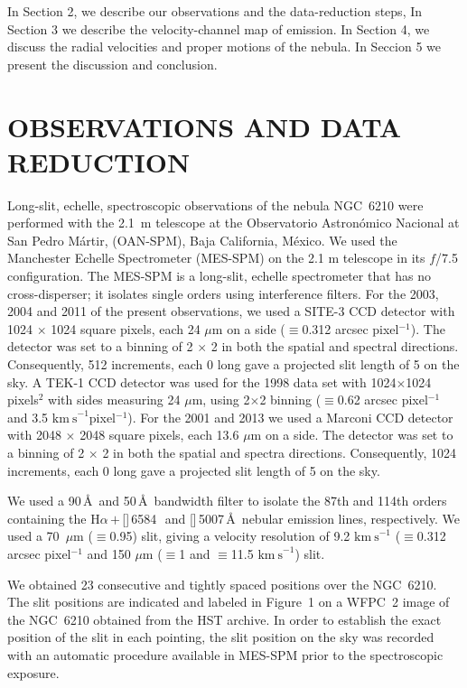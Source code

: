 \documentclass{aa}
\makeatletter
\newcommand{\kms}{\ensuremath{\mathrm{km\ s}^{-1}}}
\newcommand\NIIlam{[\ion{N}{2}]\,6584\,}
\newcommand\OIIIlam{[\ion{O}{3}]\,5007\,\AA\@}
\newcommand\Ha{\ensuremath{\mathrm{H}\alpha}}
\makeatother
\begin{document}
In Section 2, we describe our observations and the data-reduction steps, In Section 3 we describe the velocity-channel map of emission. In Section 4, we discuss the radial velocities and proper motions of the nebula. In Seccion 5 we present the discussion and conclusion.

\section{OBSERVATIONS AND DATA REDUCTION}
\label{sec:observations}

Long-slit, echelle, spectroscopic observations of the nebula NGC~6210
were performed with the 2.1~m telescope at the Observatorio
Astron\'omico Nacional at San Pedro M\'artir, (OAN-SPM), Baja
California, M\'exico. We used the Manchester Echelle Spectrometer
(MES-SPM) \citep{Meaburn03} on the 2.1 m telescope in its $f$/7.5
configuration.  The MES-SPM is a long-slit, echelle spectrometer that
has no cross-disperser; it isolates single orders using interference
filters. For the 2003, 2004 and 2011 of the present observations, we used a
SITE-3 CCD detector with 1024 $\times$ 1024 square pixels, each 24
$\mu$m on a side ($\equiv$0.312 arcsec pixel$^{-1}$). The detector
was set to a binning of 2 $\times$ 2 in both the spatial and spectral
directions. Consequently, 512 increments, each 0 long gave
a projected slit length of 5 on the sky. A TEK-1 CCD detector
was used for the 1998 data set with 1024$\times$1024 pixels$^2$ with
sides measuring 24 $\mu$m, using 2$\times$2 binning ($\equiv$0.62 arcsec
pixel$^{-1}$ and 3.5 \kms pixel$^{-1}$). For the 2001 and 2013 we used
a Marconi CCD detector with 2048 $\times$ 2048 square pixels, each 13.6
$\mu$m on a side. The detector was set to a binning of 2 $\times$ 2 in
both the spatial and spectra directions. Consequently, 1024
increments, each 0 long gave a projected slit length of
5 on the sky.

We used a 90\,\AA\, and 50\,\AA\, bandwidth
filter to isolate the 87th and 114th orders containing the
\Ha\,$+$\,\NIIlam\, and \OIIIlam\, nebular emission lines,
respectively. We used a 70~$\mu$m{} ($\equiv$0.95\arcsec) slit, giving
a velocity resolution of 9.2 \kms{} ($\equiv$0.312 arcsec
pixel$^{-1}$ and 150 $\mu$m{} ($\equiv$1 and $\equiv$11.5
\kms) slit.


We obtained 23 consecutive and tightly spaced positions over the
NGC~6210. The slit positions are indicated and labeled in Figure~1 on
a WFPC~2 image of the NGC~6210 obtained from the HST archive. In order
to establish the exact position of the slit in each pointing, the slit
position on the sky was recorded with an automatic procedure available
in MES-SPM prior to the spectroscopic exposure.
\end{document}
